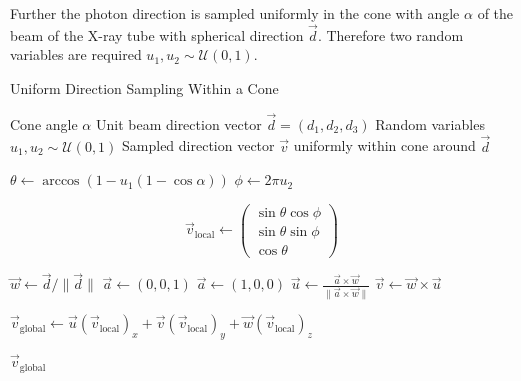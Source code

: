 Further the photon direction is sampled uniformly in the cone with angle
$\alpha$ of the beam of the X-ray tube with spherical direction $\vec{d}$.
Therefore two random variables are required $u_1, u_2 \sim \mathcal{U}(0, 1)$.

\begin{algorithm}[H]
\caption{Uniform Direction Sampling Within a Cone}
\begin{algorithmic}[1]
\Require Cone angle $\alpha$
\Require Unit beam direction vector $\vec{d} = (d_1, d_2, d_3)$
\Require Random variables $u_1, u_2 \sim \mathcal{U}(0,1)$
\Ensure Sampled direction vector $\vec{v}$ uniformly within cone around
$\vec{d}$


\State $\theta \gets \arccos(1 - u_1 (1 - \cos \alpha))$ 
\State $\phi \gets 2\pi u_2$ 


\State $$\vec{v}_{\text{local}} \gets 
\begin{pmatrix}
\sin\theta \cos\phi \\
\sin\theta \sin\phi \\
\cos\theta \end{pmatrix}$$

\State $\vec{w} \gets \vec{d} / \|\vec{d}\|$ 
    \State $\vec{a} \gets (0, 0, 1)$
\Else
    \State $\vec{a} \gets (1, 0, 0)$
\EndIf
\State $\vec{u} \gets \frac{\vec{a} \times \vec{w}}{\|\vec{a} \times \vec{w}\|}$ 
\State $\vec{v} \gets \vec{w} \times \vec{u}$ 

\State $\vec{v}_{\text{global}} \gets \vec{u} (\vec{v}_{\text{local}})_x + \vec{v} (\vec{v}_{\text{local}})_y + \vec{w} (\vec{v}_{\text{local}})_z$

\State \Return $\vec{v}_{\text{global}}$

\end{algorithmic}
\end{algorithm}




























